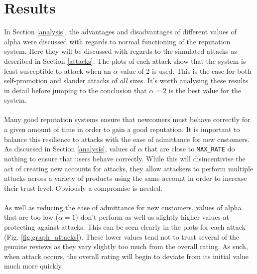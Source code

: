 \documentclass{article}
\begin{document}
\section{Results} %
In Section \ref{analysis}, the advantages and disadvantages of different values of alpha were discussed with regards to normal functioning of the reputation system. Here they will be discussed with regards to the simulated attacks as described in Section \ref{attacks}.
The plots of each attack show that the system is least susceptible to attack when an $\alpha$ value of 2 is used.
This is the case for both self-promotion and slander attacks of \textit{all} sizes.
It's worth analysing these results in detail before jumping to the conclusion that $\alpha = 2$ is the best value for the system.
\\\\
Many good reputation systems ensure that newcomers must behave correctly for a given amount of time in order to gain a good reputation. It is important to balance this resilience to attacks with the ease of admittance for new customers.\cite{attack_defense} As discussed in Section \ref{analysis}, values of $\alpha$ that are close to \texttt{MAX\_RATE} do nothing to ensure that users behave correctly. While this will disincentivise the act of creating new accounts for attacks, they allow attackers to perform multiple attacks across a variety of products using the same account in order to increase their trust level. Obviously a compromise is needed.
\\\\
As well as reducing the ease of admittance for new customers, values of alpha that are too low ($\alpha = 1$) don't perform as well as slightly higher values at protecting against attacks. This can be seen clearly in the plots for each attack (Fig. \ref{fig:graph_attacks}).
These lower values tend not to trust several of the genuine reviews as they vary slightly too much from the overall rating.
As such, when attack occurs, the overall rating will begin to deviate from its initial value much more quickly.
\\\\
\end{document}
